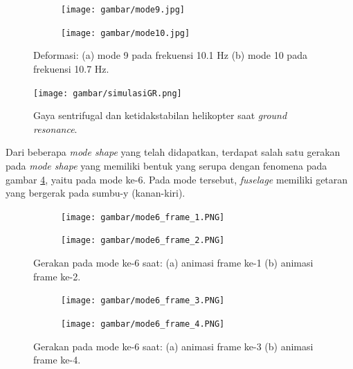 \begin{figure}[H]
	\begin{subfigure}{0.49\textwidth}
		\centering
		\texttt{[image: gambar/mode9.jpg]}
		\caption{}
		\label{fig:mode9}
	\end{subfigure}
	\centering
	\begin{subfigure}{0.49\textwidth}
		\centering
		\texttt{[image: gambar/mode10.jpg]}
		\caption{}
		\label{fig:mode10}
	\end{subfigure}
	\caption{Deformasi: (a) mode 9 pada frekuensi 10.1 Hz (b) mode 10 pada frekuensi 10.7 Hz.}
\end{figure}

\begin{figure}[H]
	\centering
	\texttt{[image: gambar/simulasiGR.png]}
	\caption{Gaya sentrifugal dan ketidakstabilan helikopter saat \textit{ground resonance}.}
	\label{fig:simulasiGR}
\end{figure}

Dari beberapa \textit{mode shape} yang telah didapatkan, terdapat salah satu gerakan pada \textit{mode shape} yang memiliki bentuk yang serupa dengan fenomena pada gambar \ref{fig:simulasiGR}, yaitu pada mode ke-6. Pada mode tersebut, \textit{fuselage} memiliki getaran yang bergerak pada sumbu-y (kanan-kiri).

\begin{figure}[H]
	\begin{subfigure}{0.49\textwidth}
		\centering
		\texttt{[image: gambar/mode6\_frame\_1.PNG]}
		\caption{}
		\label{fig:mode6_frame_1}
	\end{subfigure}
	\centering
	\begin{subfigure}{0.49\textwidth}
		\centering
		\texttt{[image: gambar/mode6\_frame\_2.PNG]}
		\caption{}
		\label{fig:mode6_frame_2}
	\end{subfigure}
	\caption{Gerakan pada mode ke-6 saat: (a) animasi frame ke-1 (b) animasi frame ke-2.}
\end{figure}

\begin{figure}[H]
	\begin{subfigure}{0.49\textwidth}
		\centering
		\texttt{[image: gambar/mode6\_frame\_3.PNG]}
		\caption{}
		\label{fig:mode6_frame_3}
	\end{subfigure}
	\centering
	\begin{subfigure}{0.49\textwidth}
		\centering
		\texttt{[image: gambar/mode6\_frame\_4.PNG]}
		\caption{}
		\label{fig:mode6_frame_4}
	\end{subfigure}
	\caption{Gerakan pada mode ke-6 saat: (a) animasi frame ke-3 (b) animasi frame ke-4.}
\end{figure}

